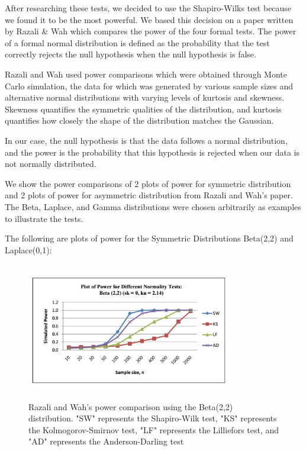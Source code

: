 \documentclass[letterpaper,english, 12pt]{article}
\begin{document}
After researching these tests, we decided to use the Shapiro-Wilks test because we found it to be the most powerful. We based this decision on a paper written by Razali \& Wah \cite{cit1} which compares the power of the four formal tests. The power of a formal normal distribution is defined as the probability that the test correctly rejects the null hypothesis when the null hypothesis is false. 

Razali and Wah used power comparisons which were obtained through Monte Carlo simulation, the data for which was generated by various sample sizes and alternative normal distributions with varying levels of kurtosis and skewness.  Skewness quantifies the symmetric qualities of the distribution, and kurtosis quantifies how closely the shape of the distribution matches the Gaussian.  

In our case, the null hypothesis is that the data follows a normal distribution, and the power is the probability that this hypothesis is rejected when our data is not normally distributed.  

We show the power comparisons of 2 plots of power for symmetric distribution and 2 plots of power for asymmetric distribution from Razali and Wah's paper. The Beta, Laplace, and Gamma distributions were chosen arbitrarily as examples to illustrate the tests.

The following are plots of power for the Symmetric Distributions Beta(2,2) and Laplace(0,1):

\begin{figure}[H]
	\centering
	\includegraphics[height=6cm,width=90mm]{pics/razali1.jpg}
	\caption{Razali and Wah's power comparison using the Beta(2,2) distribution. "SW" represents the Shapiro-Wilk test, "KS" represents the Kolmogorov-Smirnov test, "LF" represents the Lilliefors test, and "AD" represents the Anderson-Darling test}
\end{figure}
\end{document}
